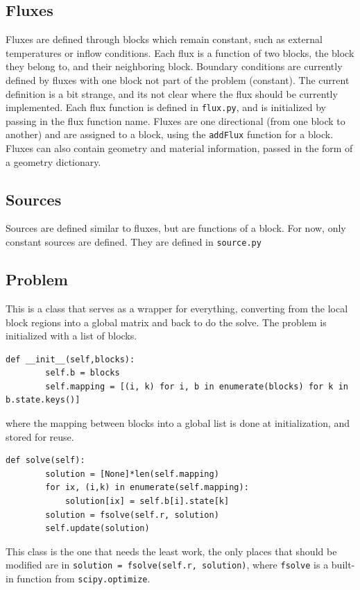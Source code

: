 \documentclass[11pt]{article}
\begin{document}
\subsection{Fluxes}
Fluxes are defined through blocks which remain constant, such as external temperatures or inflow conditions. Each flux is a function of two blocks, the block they belong to, and their neighboring block. Boundary conditions are currently defined by fluxes with one block not part of the problem (constant). The current definition is a bit strange, and its not clear where the flux should be currently implemented. Each flux function is defined in \lstinline{flux.py}, and is initialized by passing in the flux function name. Fluxes are one directional (from one block to another) and are assigned to a block, using the \lstinline{addFlux} function for a block. Fluxes can also contain geometry and material information, passed in the form of a geometry dictionary.
\subsection{Sources}
Sources are defined similar to fluxes, but are functions of a block. For now, only constant sources are defined. They are defined in \lstinline{source.py}
\subsection{Problem}
This is a class that serves as a wrapper for everything, converting from the local block regions into a global matrix and back to do the solve. The problem is initialized with a list of blocks.
\begin{lstlisting}
def __init__(self,blocks):
		self.b = blocks
		self.mapping = [(i, k) for i, b in enumerate(blocks) for k in b.state.keys()]
\end{lstlisting}
where the mapping between blocks into a global list is done at initialization, and stored for reuse. 
\begin{lstlisting}
def solve(self):
		solution = [None]*len(self.mapping)
		for ix, (i,k) in enumerate(self.mapping):
			solution[ix] = self.b[i].state[k]
		solution = fsolve(self.r, solution)
		self.update(solution)
\end{lstlisting}
This class is the one that needs the least work, the only places that should be modified are in \lstinline{solution = fsolve(self.r, solution)}, where \lstinline{fsolve} is a built-in function from \lstinline{scipy.optimize}.
\end{document}
